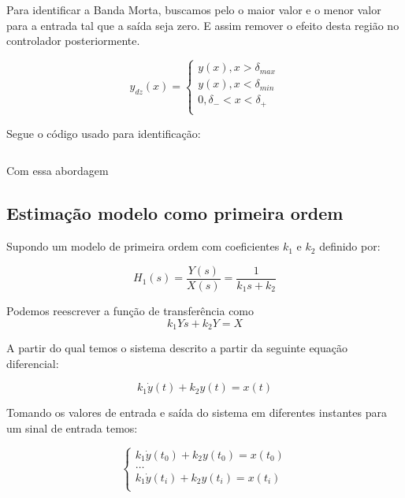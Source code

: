 \documentclass[a4paper,11pt]{article}
\begin{document}
Para identificar a Banda Morta, buscamos pelo o maior valor e o menor valor para a entrada tal que a saída seja zero. E assim remover o efeito desta região no controlador posteriormente.

\begin{equation}
    y_{dz}(x) = 
    \left\{\begin{array}{c}
    y(x), x > \delta_{max} \\
    y(x), x < \delta_{min} \\
    0, \delta_{-} < x < \delta_{+} \\
\end{array} \right.
\end{equation}

Segue o código usado para identificação:

\inputminted[frame=single,framesep=10pt]{matlab}{../src/matlab/deadzoneindetify.m}


Com essa abordagem 


\subsection{Estimação modelo como primeira ordem}

Supondo um modelo de primeira ordem com coeficientes $k_1$ e $k_2$ definido por:

\begin{equation}\label{eq:firstordertf}
    H_1(s) = \frac{Y(s)}{X(s)} = \frac{1}{k_1 s+ k_2}
\end{equation}


Podemos reescrever a função de transferência como
\begin{equation}
k_1 Ys + k_2 Y  = X
\end{equation}

A partir do qual temos o sistema descrito a partir da seguinte equação diferencial:

\begin{equation}
k_1 \dot{y}(t) + k_2 y(t) = x(t)
\end{equation}

Tomando os valores de entrada e saída do sistema em diferentes instantes para um sinal de entrada temos:

\begin{equation}
\left\{\begin{array}{c}
    k_1 \dot{y}(t_0) + k_2 y(t_0) = x(t_0)  \\
    \dots\\
    k_1 \dot{y}(t_i) + k_2 y(t_i) = x(t_i)  \\
\end{array} \right.
\end{equation}
\end{document}
